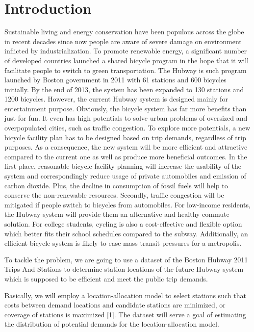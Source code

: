 \documentclass[journal, letterpaper]{IEEEtran}
\begin{document}
\section{Introduction}
\large
Sustainable living and energy conservation have been populous across the globe in recent decades since now people are aware of severe damage on environment inflicted by industrialization. To promote renewable energy, a significant number of developed countries launched a shared bicycle program in the hope that it will facilitate people to switch to green transportation. The Hubway is such program launched by Boston government in 2011 with 61 stations and 600 bicycles initially. By the end of 2013, the system has been expanded to 130 stations and 1200 bicycles. However, the current Hubway system is designed mainly for entertainment purpose. Obviously, the bicycle system has far more benefits than just for fun. It even has high potentials to solve urban problems of oversized and overpopulated cities, such as traffic congestion. To explore more potentials, a new bicycle facility plan has to be designed based on trip demands, regardless of trip purposes. As a consequence, the new system will be more efficient and attractive compared to the current one as well as produce more beneficial outcomes. In the first place, reasonable bicycle facility planning will increase the usability of the system and correspondingly reduce usage of private automobiles and emission of carbon dioxide. Plus, the decline in consumption of fossil fuels will help to conserve the non-renewable resources. Secondly, traffic congestion will be mitigated if people switch to bicycles from automobiles. For low-income residents, the Hubway system will provide them an alternative and healthy commute solution. For college students, cycling is also a cost-effective and flexible option which better fits their school schedules compared to the subway. Additionally, an efficient bicycle system is likely to ease mass transit pressures for a metropolis.   

To tackle the problem, we are going to use a dataset of the Boston Hubway 2011 Trips And Stations to determine station locations of the future Hubway system which is supposed to be efficient and meet the public trip demands. 

Basically, we will employ a location-allocation model to select stations such that costs between demand locations and candidate stations are minimized, or coverage of stations is maximized [1]. The dataset will serve a goal of estimating the distribution of potential demands for the location-allocation model.
\end{document}
